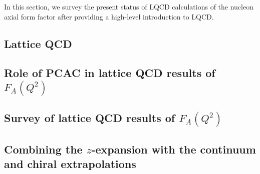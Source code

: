 In this section, we survey the present status of LQCD calculations of the nucleon axial form factor after providing a high-level introduction to LQCD.
\subsection{Lattice QCD\label{sec:lqcd_intro}}


\subsection{Role of PCAC in lattice QCD results of $F_A(Q^2)$\label{sec:lqcd_pcac}}


\subsection{Survey of lattice QCD results of $F_A(Q^2)$\label{sec:lqcd_results}}


\subsection{Combining the $z$-expansion with the continuum and chiral extrapolations\label{sec:z_continuum}}

